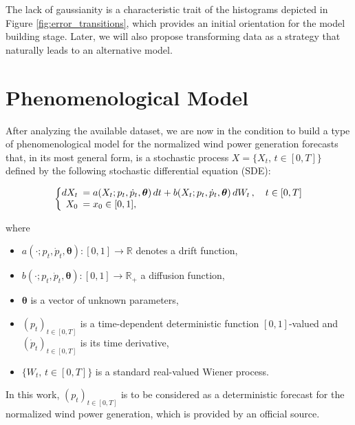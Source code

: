 \documentclass[11pt]{article}
\theoremstyle{definition}
\begin{document}
The lack of gaussianity is a characteristic trait of the histograms depicted in Figure \ref{fig:error_transitions}, which provides an initial orientation for the model building stage. Later, we will also propose transforming data as a strategy that naturally leads to an alternative model.


\section{Phenomenological  Model} \label{Section_3}

After analyzing the available dataset, we are now in the condition to build a type of phenomenological model for the normalized wind power generation forecasts that, in its most general form, is a stochastic process $X = \{X_t, \, t \in [0, T] \}$  defined by the following stochastic differential equation (SDE):

\begin{equation}
  \left\{
  \begin{array}{@{}rl@{}}
    dX_t \!\!\!&=  a(X_t; p_t, \dot{p}_t,\bm{\theta}) \,dt + b (X_t; p_t, \dot{p}_t, \bm{\theta} ) \,dW_t\,, \quad t \in [0,T]  \\
     X_0  \!\!\!&=  x_0 \in [0,1],
  \end{array}\right. \label{eq:main}
\end{equation} 

where

\begin{itemize}
\item $a(\cdot; p_t, \dot{p}_t, \bm{\theta}): [0,1] \to \mathbb{R} $  denotes a drift function,
\item $b(\cdot; p_t, \dot{p}_t, \bm{\theta}): [0,1] \to \mathbb{R}_+ $  a  diffusion function,
\item $\bm{\theta}$ is a vector of unknown parameters,
\item $(p_t)_{t \in [0,T]}$ is a time-dependent deterministic function $[0,1]$-valued and $ (\dot{p}_t)_{t \in [0,T]}$ is its time derivative,
\item $\{W_t, \, t \in [0,T] \}$ is a standard real-valued Wiener process.
\end{itemize}

In this work, $(p_t)_{t \in [0,T]}$ is to be considered as a deterministic forecast for the normalized wind power generation, which is provided by an official source. 
\end{document}
